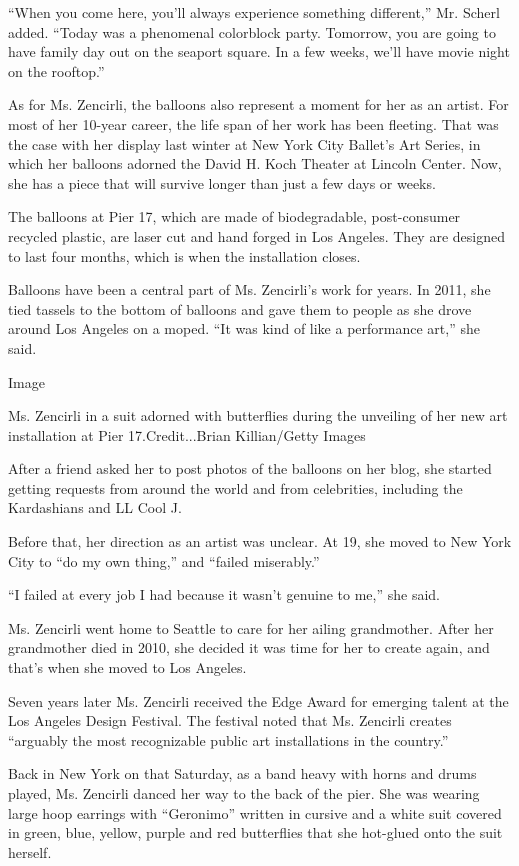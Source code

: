 ``When you come here, you'll always experience something different,''
Mr. Scherl added. ``Today was a phenomenal colorblock party. Tomorrow,
you are going to have family day out on the seaport square. In a few
weeks, we'll have movie night on the rooftop.''

As for Ms. Zencirli, the balloons also represent a moment for her as an
artist. For most of her 10-year career, the life span of her work has
been fleeting. That was the case with her display last winter at New
York City Ballet's Art Series, in which her balloons adorned the David
H. Koch Theater at Lincoln Center. Now, she has a piece that will
survive longer than just a few days or weeks.

The balloons at Pier 17, which are made of biodegradable, post-consumer
recycled plastic, are laser cut and hand forged in Los Angeles. They are
designed to last four months, which is when the installation closes.

Balloons have been a central part of Ms. Zencirli's work for years. In
2011, she tied tassels to the bottom of balloons and gave them to people
as she drove around Los Angeles on a moped. ``It was kind of like a
performance art,'' she said.

Image

Ms. Zencirli in a suit adorned with butterflies during the unveiling of
her new art installation at Pier 17.Credit...Brian Killian/Getty Images

After a friend asked her to post photos of the balloons on her blog, she
started getting requests from around the world and from celebrities,
including the Kardashians and LL Cool J.

Before that, her direction as an artist was unclear. At 19, she moved to
New York City to ``do my own thing,'' and ``failed miserably.''

``I failed at every job I had because it wasn't genuine to me,'' she
said.

Ms. Zencirli went home to Seattle to care for her ailing grandmother.
After her grandmother died in 2010, she decided it was time for her to
create again, and that's when she moved to Los Angeles.

Seven years later Ms. Zencirli received the Edge Award for emerging
talent at the Los Angeles Design Festival. The festival noted that Ms.
Zencirli creates ``arguably the most recognizable public art
installations in the country.''

Back in New York on that Saturday, as a band heavy with horns and drums
played, Ms. Zencirli danced her way to the back of the pier. She was
wearing large hoop earrings with ``Geronimo'' written in cursive and a
white suit covered in green, blue, yellow, purple and red butterflies
that she hot-glued onto the suit herself.

